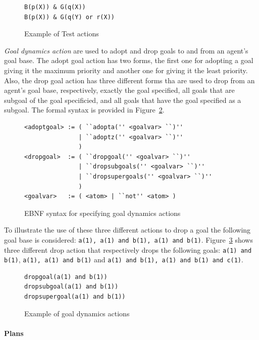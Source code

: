 \documentclass[a4paper]{article}
\begin{document}
\begin{figure}[htp]
\begin{verbatim}
B(p(X)) & G(q(X))         
B(p(X)) & G(q(Y) or r(X))  
\end{verbatim}
\caption{Example of Test actions}
\label{fig:example_testaction}
\end{figure}

\emph{Goal dynamics action} are used to adopt and drop goals to and from an agent's goal base. The adopt goal action has two forms, the first one for adopting a goal giving it the maximum priority and another one for giving it the least priority. Also, the drop goal action has three different forms tha are used to drop from an agent’s goal base, respectively, exactly the goal specified, all goals that are subgoal of the goal specificied, and all goals that have the goal specified as a subgoal. The formal syntax is provided in Figure~\ref{fig:ebnf_goalactions}.

\begin{figure}[htp]
\begin{verbatim}
<adoptgoal> := ( ``adopta('' <goalvar> ``)''
               | ``adoptz('' <goalvar> ``)''
               )
<dropgoal>  := ( ``dropgoal('' <goalvar> ``)''
               | ``dropsubgoals('' <goalvar> ``)''
               | ``dropsupergoals('' <goalvar> ``)''
               )
<goalvar>   := ( <atom> | ``not'' <atom> )
\end{verbatim}
\caption{EBNF syntax for specifying goal dynamics actions}
\label{fig:ebnf_goalactions}
\end{figure}

To illustrate the use of these three different actions to drop a goal the following goal base is considered: \texttt{a(1), a(1) and b(1), a(1) and b(1)}. Figure~\ref{fig:example_goalactions} shows three different drop action that respectively drops the following goals: \texttt{a(1) and b(1)}, \texttt{a(1), a(1) and b(1)} and \texttt{a(1) and b(1), a(1) and b(1) and c(1)}.

\begin{figure}[htp]
\begin{verbatim}
dropgoal(a(1) and b(1))
dropsubgoal(a(1) and b(1))
dropsupergoal(a(1) and b(1))
\end{verbatim}
\caption{Example of goal dynamics actions}
\label{fig:example_goalactions}
\end{figure}

\paragraph{Plans}
\end{document}
